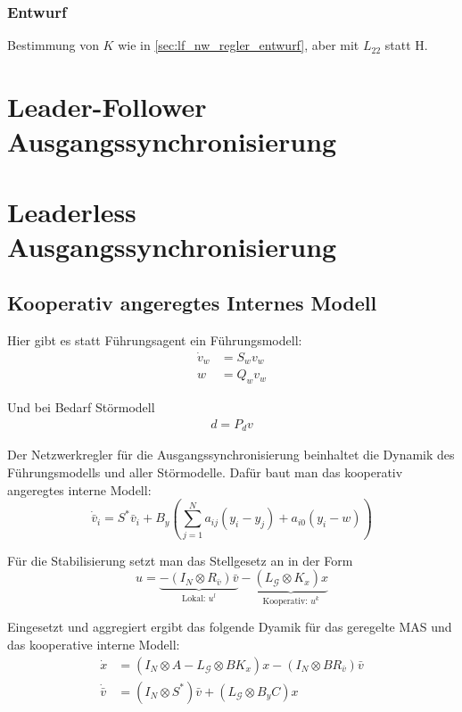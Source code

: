 \subsubsection{Entwurf}
Bestimmung von $K$ wie in \ref{sec:lf_nw_regler_entwurf},
aber mit $L_{22}$ statt H.


\pagebreak
\section{Leader-Follower Ausgangssynchronisierung}

\pagebreak
\section{Leaderless Ausgangssynchronisierung}
\subsection{Kooperativ angeregtes Internes Modell}
Hier gibt es statt Führungsagent ein Führungsmodell:
\begin{align}
    \dot{v}_w &= S_w v_w \\
    w &= Q_w v_w
\end{align}


Und bei Bedarf Störmodell
\begin{align}
    d = P_d v
\end{align}

Der Netzwerkregler für die Ausgangssynchronisierung beinhaltet die
Dynamik des Führungsmodells und aller Störmodelle.
Dafür baut man das kooperativ angeregtes interne Modell:
\begin{equation}
    \dot{\bar{v}}_i = S^*\bar{v}_i + B_y\left(\sum_{j=1}^N a_{ij} (y_i-y_j) + a_{i0} (y_i-w) \right)
\end{equation}



Für die Stabilisierung setzt man das Stellgesetz an in der Form
\begin{equation}
    u=\underbrace{-(I_N \otimes R_{\bar{v}})\bar{v}}_{\text{Lokal: }u^l} - \underbrace{(L_{\mathcal{G}} \otimes K_x)x}_{\text{Kooperativ: }u^k}
\end{equation}

Eingesetzt und aggregiert ergibt das folgende Dyamik für das geregelte MAS und das kooperative
interne Modell:
\begin{align}
    \dot{x} &= (I_N \otimes A - L_{\mathcal{G}} \otimes BK_x) x - (I_N \otimes BR_{\bar{v}})\bar{v} \\
    \dot{\bar{v}} &= (I_N \otimes S^*)\bar{v} + (L_{\mathcal{G}}\otimes B_y C)x
\end{align}

